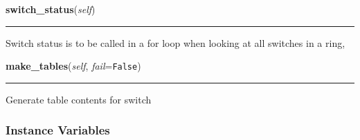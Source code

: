     \label{Data_Plane_DHT:Switch:switch_status}

    \vspace{0.5ex}

\hspace{.8\funcindent}\begin{boxedminipage}{\funcwidth}

    \raggedright \textbf{switch\_status}(\textit{self})

    \vspace{-1.5ex}

    \rule{\textwidth}{0.5\fboxrule}
\setlength{\parskip}{2ex}
    Switch status is to be called in a for loop when looking at all 
    switches in a ring,

\setlength{\parskip}{1ex}
    \end{boxedminipage}

    \label{Data_Plane_DHT:Switch:make_tables}

    \vspace{0.5ex}

\hspace{.8\funcindent}\begin{boxedminipage}{\funcwidth}

    \raggedright \textbf{make\_tables}(\textit{self}, \textit{fail}={\tt False})

    \vspace{-1.5ex}

    \rule{\textwidth}{0.5\fboxrule}
\setlength{\parskip}{2ex}
    Generate table contents for switch

\setlength{\parskip}{1ex}
    \end{boxedminipage}



  \subsubsection{Instance Variables}

